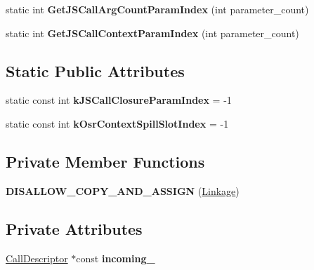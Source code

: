 \begin{DoxyCompactItemize}
\item 
static int {\bfseries Get\+J\+S\+Call\+Arg\+Count\+Param\+Index} (int parameter\+\_\+count)\hypertarget{classv8_1_1internal_1_1compiler_1_1_linkage_a3915e2418081caad877584238ff3c923}{}\label{classv8_1_1internal_1_1compiler_1_1_linkage_a3915e2418081caad877584238ff3c923}

\item 
static int {\bfseries Get\+J\+S\+Call\+Context\+Param\+Index} (int parameter\+\_\+count)\hypertarget{classv8_1_1internal_1_1compiler_1_1_linkage_a25735a05f61b95969cc11d53306f7329}{}\label{classv8_1_1internal_1_1compiler_1_1_linkage_a25735a05f61b95969cc11d53306f7329}

\end{DoxyCompactItemize}
\subsection*{Static Public Attributes}
\begin{DoxyCompactItemize}
\item 
static const int {\bfseries k\+J\+S\+Call\+Closure\+Param\+Index} = -\/1\hypertarget{classv8_1_1internal_1_1compiler_1_1_linkage_a8baedbe94adccb7e24c2b1e568a0c6bc}{}\label{classv8_1_1internal_1_1compiler_1_1_linkage_a8baedbe94adccb7e24c2b1e568a0c6bc}

\item 
static const int {\bfseries k\+Osr\+Context\+Spill\+Slot\+Index} = -\/1\hypertarget{classv8_1_1internal_1_1compiler_1_1_linkage_aa7d05f42f4ed3adf29e52ab2b97944a8}{}\label{classv8_1_1internal_1_1compiler_1_1_linkage_aa7d05f42f4ed3adf29e52ab2b97944a8}

\end{DoxyCompactItemize}
\subsection*{Private Member Functions}
\begin{DoxyCompactItemize}
\item 
{\bfseries D\+I\+S\+A\+L\+L\+O\+W\+\_\+\+C\+O\+P\+Y\+\_\+\+A\+N\+D\+\_\+\+A\+S\+S\+I\+GN} (\hyperlink{classv8_1_1internal_1_1compiler_1_1_linkage}{Linkage})\hypertarget{classv8_1_1internal_1_1compiler_1_1_linkage_a7a4646e9da6800e315e3de929ac68ebc}{}\label{classv8_1_1internal_1_1compiler_1_1_linkage_a7a4646e9da6800e315e3de929ac68ebc}

\end{DoxyCompactItemize}
\subsection*{Private Attributes}
\begin{DoxyCompactItemize}
\item 
\hyperlink{classv8_1_1internal_1_1compiler_1_1_call_descriptor}{Call\+Descriptor} $\ast$const {\bfseries incoming\+\_\+}\hypertarget{classv8_1_1internal_1_1compiler_1_1_linkage_a0b4cf72fc70ebb4bff767ff75cf303fe}{}\label{classv8_1_1internal_1_1compiler_1_1_linkage_a0b4cf72fc70ebb4bff767ff75cf303fe}

\end{DoxyCompactItemize}


